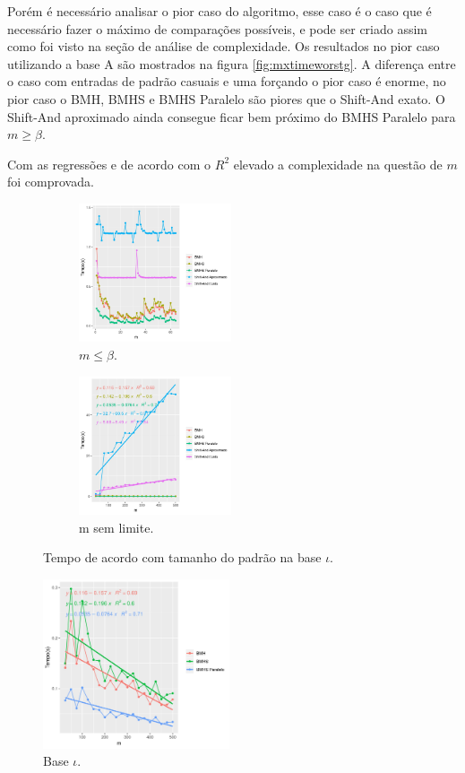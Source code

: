 \documentclass[11pt]{article}
\begin{document}
Porém é necessário analisar o pior caso do algoritmo, esse caso é o caso que é necessário fazer o máximo de comparações possíveis, e pode ser criado assim como foi visto na seção de análise de complexidade. Os resultados no pior caso utilizando a base A são mostrados na figura \ref{fig:mxtimeworstg}. A diferença entre o caso com entradas de padrão casuais e uma forçando o pior caso é enorme, no pior caso o BMH, BMHS e BMHS Paralelo são piores que o Shift-And exato. O Shift-And aproximado ainda consegue ficar bem próximo do BMHS Paralelo para \(m\geq \beta\). 

Com as regressões e de acordo com o \(R^2\) elevado a complexidade na questão de \(m\) foi comprovada.


\begin{center}
\begin{figure}
\begin{subfigure}[b]{.49\linewidth}
\centering
\includegraphics[width=4.5cm]{mxtimewordbound}
\caption{$m\leq \beta$.}\label{fig:mxtimewordbound}
\end{subfigure}
\begin{subfigure}[b]{.49\linewidth}
\centering
\includegraphics[width=4.5cm]{mxtimenobound}
\caption{m sem limite.}\label{fig:mxtimenobound}
\end{subfigure}
\caption{Tempo de acordo com tamanho do padrão na base $\iota$.}
\end{figure}
\end{center}

\begin{figure}
\caption{Base $\iota$.}\label{fig:mxtimenoboundb}
\includegraphics[width=5.5cm]{mxtimenoboundb}
\end{figure} 
\end{document}
